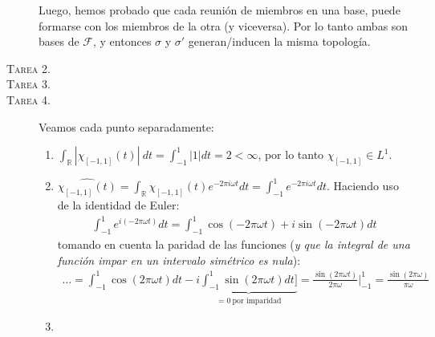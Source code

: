 \documentclass[spanish, fleqn]{article}
\begin{document}
\begin{description}
	Luego, hemos probado que cada reunión de miembros en una base, puede formarse con los miembros de la otra (y viceversa). Por lo tanto ambas son bases de $\mathcal{F}$, y entonces $\sigma$ y $\sigma'$ generan/inducen la misma topología.




	\item[\textsc{Tarea 2.}]




	\item[\textsc{Tarea 3.}]




	\item[\textsc{Tarea 4.}] Veamos cada punto separadamente:
	\begin{enumerate}
		\item $\displaystyle \int_{\mathbb{R}} |\chi_{[-1,1]}(t)|\ dt = \int_{-1}^{1} |1| dt = 2 < \infty$, por lo tanto $\chi_{[-1,1]} \in L^1$.
		\item $\displaystyle \widehat{\chi_{[-1,1]}(t)} = \int_{\mathbb{R}} \chi_{[-1,1]}(t) e^{-2 \pi i \omega t} dt = \int_{-1}^{1} e^{-2 \pi i \omega t} dt$. Haciendo uso de la identidad de Euler:
		\begin{align*}
			\int_{-1}^{1} e^{i (-2 \pi \omega t)} dt = \int_{-1}^{1} \cos(-2 \pi \omega t) + i \sin(-2 \pi \omega t) dt
		\end{align*}
		tomando en cuenta la paridad de las funciones (\textit{y que la integral de una función impar en un intervalo simétrico es nula}):
		\begin{align*}
			\ldots = \int_{-1}^{1} \cos(2 \pi \omega t) dt - i \underbrace{\int_{-1}^{1} \sin(2 \pi \omega t) dt]}_{= 0 \ \text{por imparidad}} = \frac{\sin(2 \pi \omega t)}{2 \pi \omega} \bigg|_{-1}^{1} = \frac{\sin(2 \pi \omega)}{\pi \omega}
		\end{align*}
		\item

	\end{enumerate}





\end{description}
\end{document}
